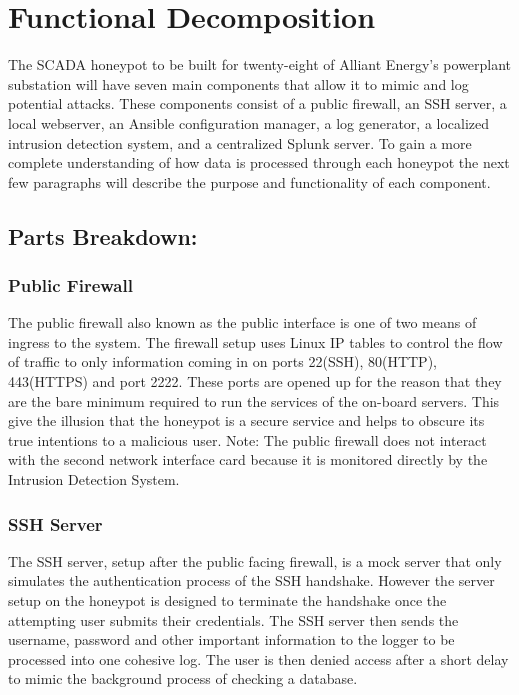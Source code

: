 \section{Functional Decomposition}

The SCADA honeypot to be built for twenty-eight of Alliant Energy's powerplant substation will have seven main components that allow it to mimic and log potential attacks.  These components consist of a public firewall, an SSH server, a local webserver, an Ansible configuration manager, a log generator, a localized intrusion detection system, and a centralized Splunk server.  To gain a more complete understanding of how data is processed through each honeypot the next few paragraphs will describe the purpose and functionality of each component.

\subsection{Parts Breakdown:}

\subsubsection{Public Firewall}
The public firewall also known as the public interface is one of two means of ingress to the system.  The firewall setup uses Linux IP tables to control the flow of traffic to only information coming in on ports 22(SSH), 80(HTTP), 443(HTTPS) and port 2222.  These ports are opened up for the reason that they are the bare minimum required to run the services of the on-board servers.  This give the illusion that the honeypot is a secure service and helps to obscure its true intentions to a malicious user.  Note: The public firewall does not interact with the second network interface card because it is monitored directly by the Intrusion Detection System.

\subsubsection{SSH Server}
The SSH server, setup after the public facing firewall, is a mock server that only simulates the authentication process of the SSH handshake.  However the server setup on the honeypot is designed to terminate the handshake once the attempting user submits their credentials.  The SSH server then sends the username, password and other important information to the logger to be processed into one cohesive log. The user is then denied access after a short delay to mimic the background process of checking a database.

